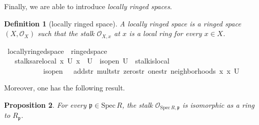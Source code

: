 \documentclass[12pt]{scrartcl}
\newtheorem{proposition}{Proposition}[section]
\newtheorem{definition}[proposition]{Definition}
\def\spec{\text{Spec}\,R}
\begin{document}
Finally, we are able to introduce \emph{locally ringed spaces}.

\begin{definition}[locally ringed space]
	A locally ringed space is a ringed space $(X, \mathscr{O}_X)$ such that the stalk $\mathscr{O}_{X, x}$ at $x$ is a local ring for every $x \in X$.
\end{definition}

\begin{isabelle}
\isamarkupfalse%
\ locally{\isacharunderscore}{\kern0pt}ringed{\isacharunderscore}{\kern0pt}space\ {\isacharequal}{\kern0pt}\ ringed{\isacharunderscore}{\kern0pt}space\ {\isacharplus}{\kern0pt}\isanewline
\ \ \ stalks{\isacharunderscore}{\kern0pt}are{\isacharunderscore}{\kern0pt}local{\isacharcolon}{\kern0pt}\ {\isachardoublequoteopen}{\isasymAnd}x\ U{\isachardot}{\kern0pt}\ x\ {\isasymin}\ U\ {\isasymLongrightarrow}\ is{\isacharunderscore}{\kern0pt}open\ U\ {\isasymLongrightarrow}\ stalk{\isachardot}{\kern0pt}is{\isacharunderscore}{\kern0pt}local\ \isanewline
\ \ \ \ \ \ \ \ \ \ \ is{\isacharunderscore}{\kern0pt}open\ {\isasymFF}\ {\isasymrho}\ add{\isacharunderscore}{\kern0pt}str\ mult{\isacharunderscore}{\kern0pt}str\ zero{\isacharunderscore}{\kern0pt}str\ one{\isacharunderscore}{\kern0pt}str\ {\isacharparenleft}{\kern0pt}neighborhoods\ x{\isacharparenright}{\kern0pt}\ x\ U{\isachardoublequoteclose}
\end{isabelle}

Moreover, one has the following result.

\begin{proposition}
	\label{prop:keyprop}
	For every $\mathfrak{p} \in \text{Spec}\,R$, the stalk $\mathscr{O}_{\spec, \mathfrak{p}}$ is isomorphic as a ring to $R_{\mathfrak{p}}$.	
\end{proposition}	
\end{document}

